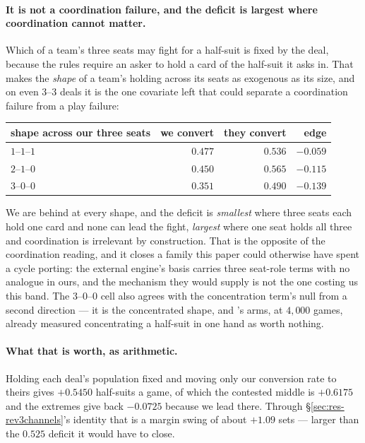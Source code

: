 \documentclass[11pt,letterpaper]{article}
\begin{document}
\paragraph{It is not a coordination failure, and the deficit is largest where
coordination cannot matter.} Which of a team's three seats may fight for a
half-suit is fixed by the deal, because the rules require an asker to hold a
card of the half-suit it asks in. That makes the \emph{shape} of a team's
holding across its seats as exogenous as its size, and on even $3$--$3$ deals
it is the one covariate left that could separate a coordination failure from
a play failure:

\begin{center}
\small
\begin{tabular}{lrrr}
\toprule
shape across our three seats & we convert & they convert & edge \\
\midrule
$1$--$1$--$1$ & $0.477$ & $0.536$ & $\mathbf{-0.059}$ \\
$2$--$1$--$0$ & $0.450$ & $0.565$ & $-0.115$ \\
$3$--$0$--$0$ & $0.351$ & $0.490$ & $\mathbf{-0.139}$ \\
\bottomrule
\end{tabular}
\end{center}

\noindent We are behind at every shape, and the deficit is \emph{smallest}
where three seats each hold one card and none can lead the fight, \emph{largest}
where one seat holds all three and coordination is irrelevant by construction.
That is the opposite of the coordination reading, and it closes a family this
paper could otherwise have spent a cycle porting: the external engine's basis
carries three seat-role terms with no analogue in ours, and the mechanism they
would supply is not the one costing us this band. The $3$--$0$--$0$ cell also
agrees with the concentration term's null from a second direction --- it is
the concentrated shape, and 's arms, at
$4{,}000$ games, already measured concentrating a half-suit in one hand as
worth nothing.

\paragraph{What that is worth, as arithmetic.} Holding each deal's population
fixed and moving only our conversion rate to theirs gives $+0.5450$ half-suits
a game, of which the contested middle is $+0.6175$ and the extremes give back
$-0.0725$ because we lead there. Through \S\ref{sec:res-rev3channels}'s
identity that is a margin swing of about $\mathbf{+1.09}$ sets --- larger than
the $0.525$ deficit it would have to close.
\end{document}
